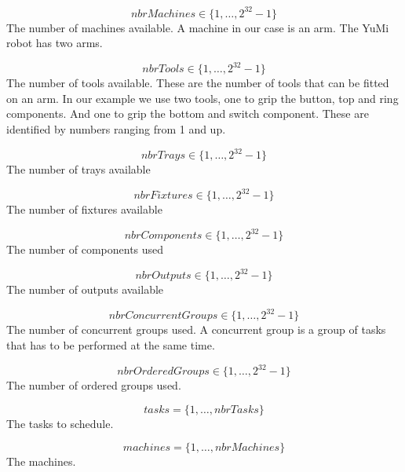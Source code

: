 \documentclass[10pt,a4paper]{report}
\begin{document}
\begin{equation}\label{eq:2}
nbrMachines \in \{1 , \ldots , 2^{32}-1\}
\end{equation}
The number of machines available. A machine in our case is an arm. The YuMi robot has two arms.

\begin{equation}\label{eq:3}
nbrTools \in \{1 , \ldots , 2^{32}-1\}
\end{equation}
The number of tools available. These are the number of tools that can be fitted on an arm. In our example we use two tools, one to grip the button, top and ring components. And one to grip the bottom and switch component. These are identified by numbers ranging from 1 and up.

\begin{equation}\label{eq:4}
nbrTrays \in \{1 , \ldots , 2^{32}-1\}
\end{equation}
The number of trays available

\begin{equation}\label{eq:5}
nbrFixtures \in \{1 , \ldots , 2^{32}-1\}
\end{equation}
The number of fixtures available

\begin{equation}\label{eq:6}
nbrComponents \in \{1 , \ldots , 2^{32}-1\}
\end{equation}
The number of components used

\begin{equation}\label{eq:7}
nbrOutputs \in \{1 , \ldots , 2^{32}-1\}
\end{equation}
The number of outputs available

\begin{equation}\label{eq:8}
nbrConcurrentGroups \in \{1 , \ldots , 2^{32}-1\}
\end{equation}
The number of concurrent groups used. A concurrent group is a group of tasks that has to be performed at the same time.

\begin{equation}\label{eq:9}
nbrOrderedGroups \in \{1 , \ldots , 2^{32}-1\}
\end{equation}
The number of ordered groups used.

\begin{equation}\label{eq:10}
tasks = \{1 , \ldots , nbrTasks\}\end{equation}
The tasks to schedule.

\begin{equation}\label{eq:11}
machines = \{1 , \ldots , nbrMachines\}\end{equation}
The machines.
\end{document}
